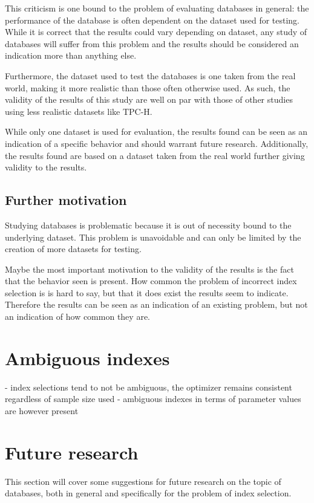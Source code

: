 This criticism is one bound to the problem of evaluating databases in general:
the performance of the database is often dependent on the dataset used for
testing. While it is correct that the results could vary depending on dataset,
any study of databases will suffer from this problem and the results should be
considered an indication more than anything else.

Furthermore, the dataset used to test the databases is one taken from the real
world, making it more realistic than those often otherwise used. As such, the
validity of the results of this study are well on par with those of other
studies using less realistic datasets like TPC-H.

While only one dataset is used for evaluation, the results found can be seen as
an indication of a specific behavior and should warrant future research.
Additionally, the results found are based on a dataset taken from the real
world further giving validity to the results.

\subsection{Further motivation}
Studying databases is problematic because it is out of necessity bound to the
underlying dataset. This problem is unavoidable and can only be limited by the
creation of more datasets for testing.

Maybe the most important motivation to the validity of the results is the fact
that the behavior seen is present. How common the problem of incorrect index
selection is is hard to say, but that it does exist the results seem to
indicate. Therefore the results can be seen as an indication of an existing
problem, but not an indication of how common they are.

\section{Ambiguous indexes}
- index selections tend to not be ambiguous, the optimizer remains consistent regardless of sample size used
- ambiguous indexes in terms of parameter values are however present

\section{Future research}
This section will cover some suggestions for future research on the topic of
databases, both in general and specifically for the problem of index selection.


